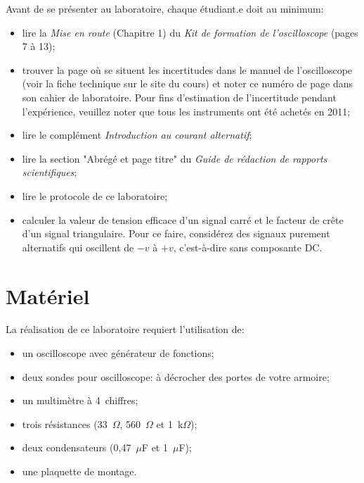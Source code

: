 \documentclass[canadien,12pt,oneside,letterpaper]{article}
\begin{document}
\noindent Avant de se présenter au laboratoire, chaque étudiant.e doit au minimum:
\vspace{1ex}
\begin{itemize}
\item lire la \textit{Mise en route} (Chapitre 1) du \textit{Kit de formation de l'oscilloscope} (pages 7 à 13);
\item trouver la page où se situent les incertitudes dans le manuel de l'oscilloscope (voir la fiche technique sur le site du cours) et noter ce numéro de page dans son cahier de laboratoire. Pour fins d'estimation de l'incertitude pendant l'expérience, veuillez noter que tous les instruments ont été achetés en 2011;
\item lire le complément \textit{Introduction au courant alternatif};
\item lire la section "Abrégé et page titre" du \textit{Guide de rédaction de rapports scientifiques};
\item lire le protocole de ce laboratoire;
\item calculer la valeur de tension efficace d'un signal carré et le facteur de crête d'un signal triangulaire. Pour ce faire, considérez des signaux purement alternatifs qui oscillent de $-v$ à $+v$, c'est-à-dire sans composante DC.
\end{itemize}

\section{Matériel}

\noindent La réalisation de ce laboratoire requiert l'utilisation de:
\vspace{1ex}
\begin{itemize}
\item un oscilloscope avec générateur de fonctions;
\item deux sondes pour oscilloscope: à décrocher des portes de votre armoire;
\item un multimètre à 4\textonehalf~chiffres;
\item trois résistances (33~$\Omega$, 560~$\Omega$ et 1~k$\Omega$);
\item deux condensateurs (0,47~$\mu$F et 1~$\mu$F);
\item une plaquette de montage.
\end{itemize}
\end{document}
